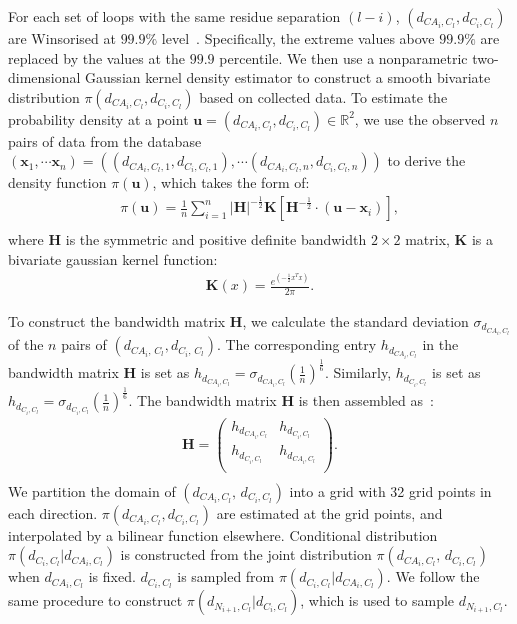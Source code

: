 For each set of loops with the same residue separation $(l-i)$,
$(d_{CA_i,C_l}, d_{C_i,C_l})$ are Winsorised at $99.9\%$
level~\cite{lewis2008}. Specifically, the extreme values above
$99.9\%$ are replaced by the values at the $99.9$ percentile. We
then use a nonparametric two-dimensional Gaussian kernel density
estimator to construct a smooth bivariate distribution
$\pi(d_{CA_i,C_l}, d_{C_i,C_l})$ based on collected data. To
estimate the probability density at a point $\mathbf{u} =
(d_{CA_i,C_l},d_{C_i,C_l}) \in \mathbb{R}^2$, we use the observed
$n$ pairs of data from the database $(\mathbf{x}_{1}, \cdots
\mathbf{x}_{n}) =((d_{CA_i,C_l,1},d_{C_i,C_l,1}), \cdots
(d_{CA_i,C_l,n},d_{C_i,C_l,n}))$ to derive the density function
$\pi(\mathbf{u})$, which takes the form of:
\begin{equation}
\left. \begin{aligned} \pi(\mathbf{u}) = \frac{1}{n}\sum
\limits_{i=1}^n
 |\mathbf{H}|^{-\frac{1}{2}} \mathbf{K}
[ \mathbf{H}^{-\frac{1}{2}} \cdot (\mathbf{u} - \mathbf{x}_{i})],\\
\end{aligned} \right.
\end{equation}
where $\mathbf{H}$ is the symmetric and positive definite bandwidth
$2\times2$ matrix, $\mathbf{K}$ is a bivariate gaussian kernel
function:
\begin{equation}
\left. \begin{aligned} \mathbf{K}(x) =
\frac{e^{(-\frac{1}{2}x^{T}x)}}{2\pi}.
\end{aligned} \right.
\end{equation}

To construct the bandwidth matrix $\mathbf{H}$, we calculate the
standard deviation $\sigma_{d_{CA_i,C_l}}$ of the $n$ pairs of
$(d_{CA_i,\, C_l}, d_{C_i,\, C_l})$. The corresponding entry
$h_{d_{CA_i,C_l}}$ in the bandwidth matrix $\mathbf{H}$ is set as
$h_{d_{CA_i,C_l}} =
\sigma_{d_{CA_i,C_l}}(\frac{1}{n})^{\frac{1}{6}}$. Similarly,
$h_{d_{C_i,C_l}}$ is set as $h_{d_{C_i,C_l}} =
\sigma_{d_{C_i,C_l}}(\frac{1}{n})^{\frac{1}{6}}$. The bandwidth
matrix $\mathbf{H}$ is then assembled as~\cite{bowman1997}:
\begin{equation}
\left. \begin{aligned} \mathbf{H} = \begin{pmatrix}
 h_{d_{CA_i,C_l}} & h_{d_{C_i,C_l}}\\
 h_{d_{C_i,C_l}} & h_{d_{CA_i,C_l}}\\
\end{pmatrix}.\\
\end{aligned} \right.
\end{equation}
We partition the domain of $(d_{CA_i,C_l}, \, d_{C_i,C_l})$ into a
grid with 32 grid points in each direction. $\pi(d_{CA_i,C_l},
d_{C_i,C_l})$ are estimated at the grid points, and interpolated by
a bilinear function elsewhere. Conditional distribution
$\pi(d_{C_i,C_l} | d_{CA_i,C_l})$ is constructed from the joint
distribution $\pi(d_{CA_i,C_l}, \, d_{C_i,C_l})$ when $d_{CA_i,C_l}$
is fixed. $d_{C_i,C_l}$ is sampled from $\pi(d_{C_i,C_l} |
d_{CA_i,C_l})$. We follow the same procedure to construct
$\pi(d_{N_{i+1},C_l} | d_{C_i, C_l})$, which is used to sample
$d_{N_{i+1},C_l}$.

